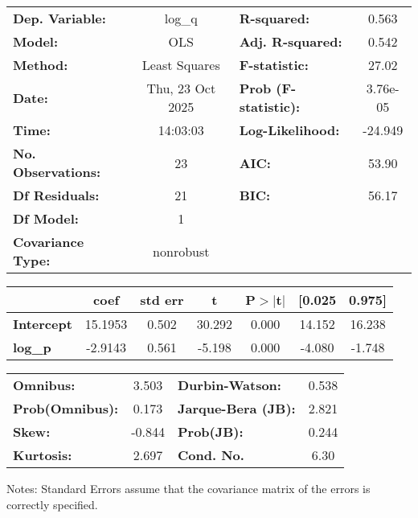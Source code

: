 \begin{center}
\begin{tabular}{lclc}
\toprule
\textbf{Dep. Variable:}    &      log\_q      & \textbf{  R-squared:         } &     0.563   \\
\textbf{Model:}            &       OLS        & \textbf{  Adj. R-squared:    } &     0.542   \\
\textbf{Method:}           &  Least Squares   & \textbf{  F-statistic:       } &     27.02   \\
\textbf{Date:}             & Thu, 23 Oct 2025 & \textbf{  Prob (F-statistic):} &  3.76e-05   \\
\textbf{Time:}             &     14:03:03     & \textbf{  Log-Likelihood:    } &   -24.949   \\
\textbf{No. Observations:} &          23      & \textbf{  AIC:               } &     53.90   \\
\textbf{Df Residuals:}     &          21      & \textbf{  BIC:               } &     56.17   \\
\textbf{Df Model:}         &           1      & \textbf{                     } &             \\
\textbf{Covariance Type:}  &    nonrobust     & \textbf{                     } &             \\
\bottomrule
\end{tabular}
\begin{tabular}{lcccccc}
                   & \textbf{coef} & \textbf{std err} & \textbf{t} & \textbf{P$> |$t$|$} & \textbf{[0.025} & \textbf{0.975]}  \\
\midrule
\textbf{Intercept} &      15.1953  &        0.502     &    30.292  &         0.000        &       14.152    &       16.238     \\
\textbf{log\_p}    &      -2.9143  &        0.561     &    -5.198  &         0.000        &       -4.080    &       -1.748     \\
\bottomrule
\end{tabular}
\begin{tabular}{lclc}
\textbf{Omnibus:}       &  3.503 & \textbf{  Durbin-Watson:     } &    0.538  \\
\textbf{Prob(Omnibus):} &  0.173 & \textbf{  Jarque-Bera (JB):  } &    2.821  \\
\textbf{Skew:}          & -0.844 & \textbf{  Prob(JB):          } &    0.244  \\
\textbf{Kurtosis:}      &  2.697 & \textbf{  Cond. No.          } &     6.30  \\
\bottomrule
\end{tabular}
\end{center}

Notes: \newline
 [1] Standard Errors assume that the covariance matrix of the errors is correctly specified.